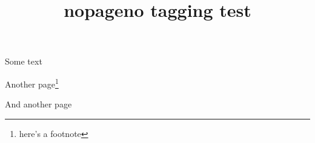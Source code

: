 \documentclass{article}
\title{nopageno tagging test}
\begin{document}
Some text

\newpage

Another page\footnote{here's a footnote}

\newpage

And another page
\end{document}
